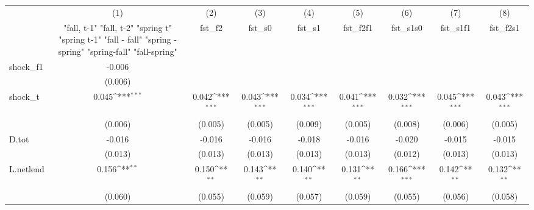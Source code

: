 {
\def\sym#1{\ifmmode^{#1}\else\(^{#1}\)\fi}
\begin{tabular}{l*{8}{c}}
\toprule
            &\multicolumn{1}{c}{(1)}&\multicolumn{1}{c}{(2)}&\multicolumn{1}{c}{(3)}&\multicolumn{1}{c}{(4)}&\multicolumn{1}{c}{(5)}&\multicolumn{1}{c}{(6)}&\multicolumn{1}{c}{(7)}&\multicolumn{1}{c}{(8)}\\
            &\multicolumn{1}{c}{  "fall, t-1" "fall, t-2" "spring t" "spring t-1"  "fall - fall" "spring - spring" "spring-fall" "fall-spring" }&\multicolumn{1}{c}{fst\_f2}&\multicolumn{1}{c}{fst\_s0}&\multicolumn{1}{c}{fst\_s1}&\multicolumn{1}{c}{fst\_f2f1}&\multicolumn{1}{c}{fst\_s1s0}&\multicolumn{1}{c}{fst\_s1f1}&\multicolumn{1}{c}{fst\_f2s1}\\
\midrule
shock\_f1    &      -0.006         &                     &                     &                     &                     &                     &                     &                     \\
            &     (0.006)         &                     &                     &                     &                     &                     &                     &                     \\
\addlinespace
shock\_t     &       0.045\sym{***}&       0.042\sym{***}&       0.043\sym{***}&       0.034\sym{***}&       0.041\sym{***}&       0.032\sym{***}&       0.045\sym{***}&       0.043\sym{***}\\
            &     (0.006)         &     (0.005)         &     (0.005)         &     (0.009)         &     (0.005)         &     (0.008)         &     (0.006)         &     (0.005)         \\
\addlinespace
D.tot       &      -0.016         &      -0.016         &      -0.016         &      -0.018         &      -0.016         &      -0.020         &      -0.015         &      -0.015         \\
            &     (0.013)         &     (0.013)         &     (0.013)         &     (0.013)         &     (0.013)         &     (0.012)         &     (0.013)         &     (0.013)         \\
\addlinespace
L.netlend   &       0.156\sym{**} &       0.150\sym{**} &       0.143\sym{**} &       0.140\sym{**} &       0.131\sym{**} &       0.166\sym{***}&       0.142\sym{**} &       0.132\sym{**} \\
            &     (0.060)         &     (0.055)         &     (0.059)         &     (0.057)         &     (0.059)         &     (0.055)         &     (0.056)         &     (0.058)         \\

\end{tabular}}
